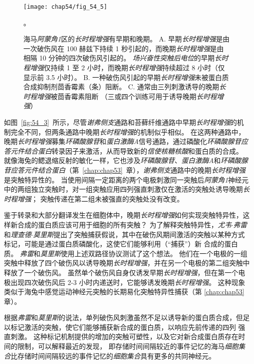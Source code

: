 \begin{figure}[htbp]
	\centering
	\texttt{[image: chap54/fig\_54\_5]}
	\caption{海马\textit{阿蒙角1}区的\textit{长时程增强}有早期和晚期。
		A. 早期\textit{长时程增强}是由一次破伤风在 100 赫兹下持续 1 秒引起的，而晚期\textit{长时程增强}是由相隔 10 分钟的四次破伤风引起的。
		\textit{场兴奋性突触后电位}的早期\textit{长时程增强}仅持续 1 至 2 小时，而晚期\textit{长时程增强}持续超过 8 小时（仅显示前 3.5 小时）。
		B. 一种破伤风引起的早期\textit{长时程增强}未被蛋白质合成抑制剂茴香霉素（条）阻断。
		C. 通常由三列刺激诱导的晚期\textit{长时程增强}被茴香霉素阻断
		（三或四个训练可用于诱导晚期\textit{长时程增强}）\cite{huang1994recruitment}}。
	\label{fig:54_5}
\end{figure}


如图~\ref{fig:54_3}~所示，尽管\textit{谢弗侧支}通路和苔藓纤维通路中早期\textit{长时程增强}的机制完全不同，但两条通路中晚期\textit{长时程增强}的机制似乎相似。
在这两种通路中，晚期\textit{长时程增强}募集\textit{环磷酸腺苷}和\textit{蛋白激酶A}信号通路，通过磷酸化\textit{环磷酸腺苷应答元件结合蛋白}转录因子来激活，从而导致新的\textit{信使核糖核酸}和蛋白质的合成。
就像海兔的鳃退缩反射的敏化一样，它也涉及\textit{环磷酸腺苷}、\textit{蛋白激酶A}和\textit{环磷酸腺苷应答元件结合蛋白}（第~\ref{chap:chap53}~章），\textit{谢弗侧支}通路中的晚期\textit{长时程增强}是突触特异性的。 当使用间隔一定距离的两个电极刺激同一突触后\textit{阿蒙角1}神经元中的两组独立突触时，对一组突触应用四列强直刺激仅在激活的突触处诱导晚期\textit{长时程增强}；
突触传递在第二组未被强直的突触处没有改变。


鉴于转录和大部分翻译发生在细胞体中，晚期\textit{长时程增强}如何实现突触特异性，这样新合成的蛋白质应该可用于细胞的所有突触？
为了解释突触特异性，\textit{尤韦$\cdot$弗雷}和\textit{理查德$\cdot$莫里斯}提出了突触捕获假说，其中在破伤风期间激活的突触以某种方式标记，可能是通过蛋白质磷酸化，这使它们能够利用（“捕获”）新 合成的蛋白质。
\textit{弗雷}和\textit{莫里斯}使用上述双路径协议测试了这个想法。
他们在一个电极的一组突触中释放了四个破伤风以诱导晚期\textit{长时程增强}，并在另一个电极的第二组突触中释放了一个破伤风。
虽然单个破伤风自身仅诱发早期\textit{长时程增强}，但在第一个电极出现四次破伤风后 2-3 小时内递送时，它能够诱发晚期\textit{长时程增强}。
这种现象类似于海兔中感觉运动神经元突触的长期易化突触特异性捕获（第 \ref{chap:chap53} 章）。


根据\textit{弗雷}和\textit{莫里斯}的说法，单列破伤风刺激虽然不足以诱导新的蛋白质合成，但足以标记激活的突触，使它们能够捕获新合成的蛋白质，以响应先前传递的四列 强直刺激。
这种标记机制提供的增加的突触可塑性，以及它对新合成蛋白质存在时间的限制，可以解释最近的发现，
即存储时间间隔较近的事件记忆的海马\textit{细胞集合}比存储时间间隔较远的事件记忆的\textit{细胞集合}具有更多的共同神经元。


